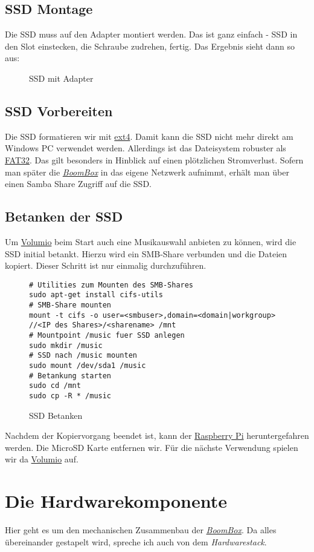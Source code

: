 \documentclass[12pt,a4paper]{article}
\newcommand{\bb}{\textit{\href{https://github.com/ThirtySomething/BoomBox}{BoomBox}}}
\newcommand{\jpaimg}[2]{\begin{figure}[H]\centering\fbox{\texttt{[image: \#1]}}\caption{#2}\label{fig:#2}\end{figure}}
\newcommand{\rpi}{\href{https://www.raspberrypi.org/}{Raspberry Pi}\index{Raspberry Pi}}
\newcommand{\vol}{\href{https://volumio.org/}{Volumio}\index{Volumio}}
\begin{document}
\subsection{SSD Montage}
Die SSD muss auf den Adapter montiert werden. Das ist ganz einfach - SSD in den Slot einstecken, die Schraube zudrehen, fertig. Das Ergebnis sieht dann so aus:

\jpaimg{./../images/ssd-prepared.png}{SSD mit Adapter}


\subsection{SSD Vorbereiten}
Die SSD formatieren wir mit \href{https://de.wikipedia.org/wiki/Ext4}{ext4}. Damit kann die SSD nicht mehr direkt am Windows PC verwendet werden. Allerdings
ist das Dateisystem robuster als \href{https://de.wikipedia.org/wiki/File_Allocation_Table#FAT32}{FAT32}. Das gilt besonders in Hinblick auf einen plötzlichen
Stromverlust. Sofern man später die \bb{} in das eigene Netzwerk aufnimmt, erhält man über einen Samba Share Zugriff auf die SSD.\@

\subsection{Betanken der SSD}\label{subsec:Betanken der SSD}
Um \vol{} beim Start auch eine Musikauswahl anbieten zu können, wird die SSD initial betankt. Hierzu wird ein SMB-Share verbunden und die Dateien
kopiert. Dieser Schritt ist nur einmalig durchzuführen.

\begin{figure}[H]
\begin{lstlisting}
# Utilities zum Mounten des SMB-Shares
sudo apt-get install cifs-utils
# SMB-Share mounten
mount -t cifs -o user=<smbuser>,domain=<domain|workgroup> //<IP des Shares>/<sharename> /mnt
# Mountpoint /music fuer SSD anlegen
sudo mkdir /music
# SSD nach /music mounten
sudo mount /dev/sda1 /music
# Betankung starten
sudo cd /mnt
sudo cp -R * /music
\end{lstlisting}
\caption{SSD Betanken}\label{fig:SSD Betanken}
\end{figure}

Nachdem der Kopiervorgang beendet ist, kann der \rpi{} heruntergefahren werden. Die MicroSD Karte entfernen wir. Für die nächste Verwendung spielen wir da
\vol{} auf.

\section{Die Hardwarekomponente}
Hier geht es um den mechanischen Zusammenbau der \bb{}. Da alles übereinander gestapelt wird, spreche ich auch von dem \textit{Hardwarestack}.
\end{document}
